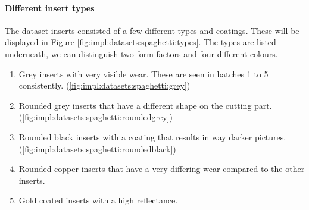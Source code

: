 \paragraph{Different insert types}
The dataset inserts consisted of a few different types and coatings. These will be displayed in Figure \ref{fig:impl:datasets:spaghetti:types}. The types are listed underneath, we can distinguish two form factors and four different colours.

\begin{enumerate}[a]
	\item Grey inserts with very visible wear. These are seen in batches 1 to 5 consistently. (\ref{fig:impl:datasets:spaghetti:grey})
	\item Rounded grey inserts that have a different shape on the cutting part.  (\ref{fig:impl:datasets:spaghetti:roundedgrey})
	\item Rounded black inserts with a coating that results in way darker pictures.  (\ref{fig:impl:datasets:spaghetti:roundedblack})
	\item Rounded copper inserts that have a very differing wear compared to the other inserts.
	\item Gold coated inserts with a high reflectance.
\end{enumerate}

